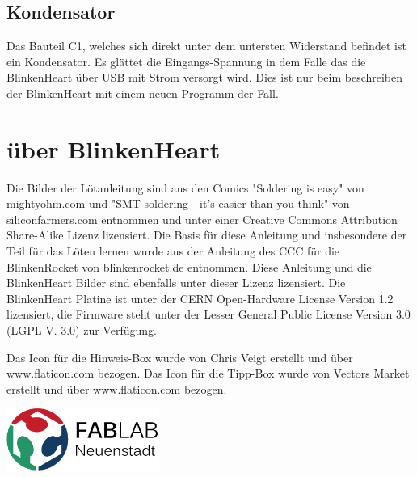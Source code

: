 \documentclass{article} %
\begin{document}
\newpage
\subsection{Kondensator}
Das Bauteil C1, welches sich direkt unter dem untersten Widerstand befindet ist ein Kondensator. Es glättet die Eingangs-Spannung in dem Falle das die BlinkenHeart über USB mit Strom versorgt wird. Dies ist nur beim beschreiben der BlinkenHeart mit einem neuen Programm der Fall.

\newpage
\section{über BlinkenHeart}
{\footnotesize Die Bilder der Lötanleitung sind aus den Comics "Soldering is easy" von mightyohm.com und
"SMT soldering - it's easier than you think" von siliconfarmers.com entnommen und unter einer
Creative Commons Attribution Share-Alike Lizenz lizensiert.
Die Basis für diese Anleitung
und insbesondere der Teil für das Löten lernen wurde aus der Anleitung des CCC für die BlinkenRocket
von blinkenrocket.de entnommen.
Diese Anleitung und die BlinkenHeart Bilder sind ebenfalls unter dieser Lizenz lizensiert.
Die BlinkenHeart Platine ist unter der CERN Open-Hardware License Version 1.2 lizensiert, die Firmware steht unter der Lesser General
Public License Version 3.0 (LGPL V. 3.0) zur Verfügung.

Das Icon für die Hinweis-Box wurde von Chris Veigt erstellt und über www.flaticon.com bezogen.
Das Icon für die Tipp-Box wurde von Vectors Market erstellt und über www.flaticon.com bezogen.}

\begin{center}
	\includegraphics[width=5cm]{logo}
\end{center}
\end{document}
